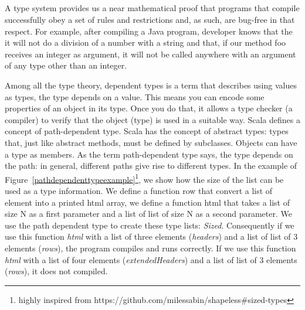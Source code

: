 \documentclass[runningheads,a4paper]{llncs}
\begin{document}
\subsection{}

A type system provides us a near mathematical proof that programs that compile successfully obey a
set of rules and restrictions and, as such, are bug-free in that respect. For example, after
compiling a Java program, developer knows that the it will not do a division of a number with a
string and that, if our method foo receives an integer as argument, it will not be called anywhere
with an argument of any type other than an integer.

Among all the type theory,  dependent types is a term that describes using values as types, the type
depends on a value. This means you can encode some properties of an object in its type. Once you do
that, it allows a type checker (a compiler) to verify that the object (type) is used in a suitable
way. Scala defines a concept of path-dependent type. Scala has the concept of abstract types: types
that, just like abstract methods, must be defined by subclasses. Objects can have a type as members.
As the term path-dependent type says, the type depends on the path: in general, different paths give
rise to different types. In the example of Figure~\ref{pathdependenttypeexample}\footnote{highly inspired from https://github.com/milessabin/shapeless\#sized-types}, we show how the size of the list can be used as a type information. We define a function row that convert a list of element into a printed html array, we define a function html that takes a list of size N as a first parameter and a list of list of size N as a second parameter. We use the path dependent type to create these type lists: \emph{Sized}. Consequently if we use this function \emph{html} with a list of three elements (\textit{headers}) and a list of list of 3 elements (\textit{rows}), the program compiles and runs correctly. If we use  this function \emph{html} with a list of four elements (\textit{extendedHeaders}) and a list of list of 3 elements (\textit{rows}), it does not compiled. 
\end{document}
